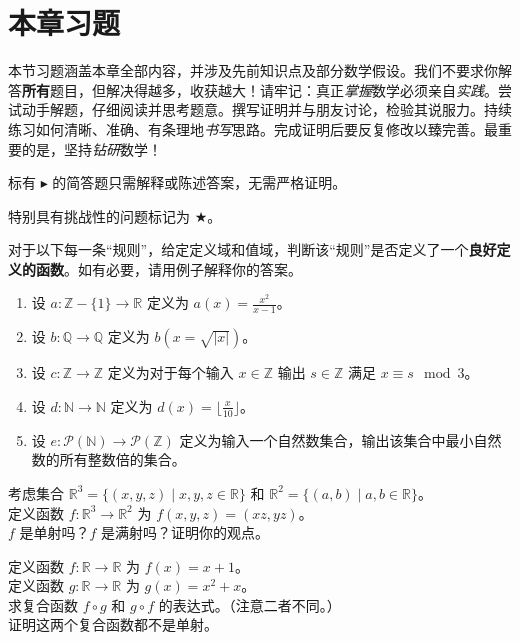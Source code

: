 \section{本章习题}

本节习题涵盖本章全部内容，并涉及先前知识点及部分数学假设。我们不要求你解答\textbf{所有}题目，但解决得越多，收获越大！请牢记：真正\emph{掌握}数学必须亲自\emph{实践}。尝试动手解题，仔细阅读并思考题意。撰写证明并与朋友讨论，检验其说服力。持续练习如何清晰、准确、有条理地\emph{书写}思路。完成证明后要反复修改以臻完善。最重要的是，坚持\emph{钻研}数学！

标有 $\blacktriangleright$ 的简答题只需解释或陈述答案，无需严格证明。

特别具有挑战性的问题标记为 $\bigstar$。\\

\begin{exercise}
    对于以下每一条``规则''，给定定义域和值域，判断该``规则''是否定义了一个\textbf{良好定义的函数}。如有必要，请用例子解释你的答案。
    \begin{enumerate}[label=(\alph*)]
        \item 设 $a : \mathbb{Z} - \{1\} \to \mathbb{R}$ 定义为 $a(x) = \frac{x^2}{x-1}$。
        \item 设 $b : \mathbb{Q} \to \mathbb{Q}$ 定义为 $b(x = \sqrt{|x|})$。
        \item 设 $c : \mathbb{Z} \to \mathbb{Z}$ 定义为对于每个输入 $x \in \mathbb{Z}$ 输出 $s \in \mathbb{Z}$ 满足 $x \equiv s \mod 3$。
        \item 设 $d : \mathbb{N} \to \mathbb{N}$ 定义为 $d(x) = \lfloor\frac{x}{10}\rfloor$。
        \item 设 $e : \mathcal{P}(\mathbb{N}) \to \mathcal{P}(\mathbb{Z})$ 定义为输入一个自然数集合，输出该集合中最小自然数的所有整数倍的集合。
    \end{enumerate}
\end{exercise}

\begin{exercise}
    考虑集合 $\mathbb{R}^3 = \{(x, y, z) \mid x, y, z \in \mathbb{R}\}$ 和 $\mathbb{R}^2 = \{(a, b) \mid a, b \in \mathbb{R}\}$。\\
    定义函数 $f : \mathbb{R}^3 \to \mathbb{R}^2$ 为 $f(x, y, z) = (xz, yz)$。\\
    $f$ 是单射吗？$f$ 是满射吗？证明你的观点。
\end{exercise}

\begin{exercise}
    定义函数 $f : \mathbb{R} \to \mathbb{R}$ 为 $f(x) = x + 1$。\\
    定义函数 $g : \mathbb{R} \to \mathbb{R}$ 为 $g(x) = x^2 + x$。\\
    求复合函数 $f \circ g$ 和 $g \circ f$ 的表达式。（注意二者不同。）\\
    证明这两个复合函数都不是单射。
\end{exercise}

